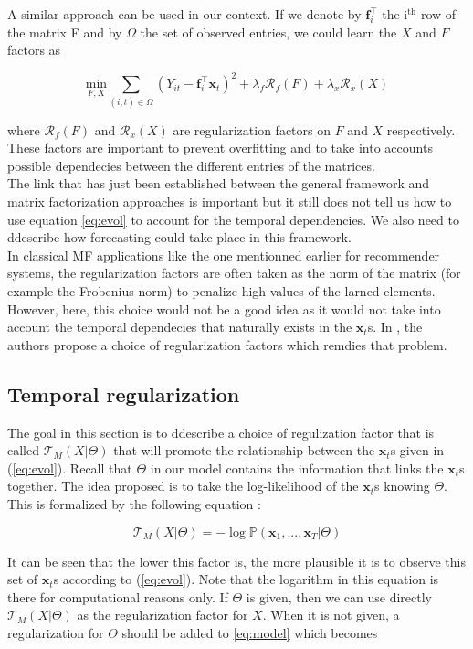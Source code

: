 \documentclass{article}
\begin{document}
A similar approach can be used in our context. If we denote by $\mathbf{f}_i^\top$ the i$^\text{th}$ row of the matrix F and by $\Omega$ the set of observed entries, we could learn the $X$ and $F$ factors as

\begin{equation}
\underset{F,X}{\text{min}} \sum_{(i,t) \in \Omega} (Y_{it} - \mathbf{f}_i^\top\mathbf{x}_t)^2 + \lambda_f \mathcal{R}_f(F) + \lambda_x \mathcal{R}_x(X)
\label{eq:model}
\end{equation}

where $\mathcal{R}_f(F)$ and $\mathcal{R}_x(X)$ are regularization factors on $F$ and $X$ respectively. These factors are important to prevent overfitting and to take into accounts possible dependecies between the different entries of the matrices. \\
The link that has just been established between the general framework and matrix factorization approaches is important but it still does not tell us how to use equation \ref{eq:evol} to account for the temporal dependencies. We also need to ddescribe how forecasting could take place in this framework. \\
In classical MF applications like the one mentionned earlier for recommender systems, the regularization factors are often taken as the norm of the matrix (for example the Frobenius norm) to penalize high values of the larned elements. However, here, this choice would not be a good idea as it would not take into account the temporal dependecies that naturally exists in the $\mathbf{x}_t$s. In \cite{TRMF}, the authors propose a choice of regularization factors which remdies that problem.

\subsection*{Temporal regularization}

The goal in this section is to ddescribe a choice of regulization factor that is called $\mathcal{T}_M(X | \Theta)$ that will promote the relationship between the $\mathbf{x}_t$s given in (\ref{eq:evol}).
Recall that $\Theta$ in our model contains the information that links the $\mathbf{x}_t$s together. The idea proposed is to take the log-likelihood of the $\mathbf{x}_t$s knowing $\Theta$. This is formalized by the following equation :

$$\mathcal{T}_M(X | \Theta) = -\log{\mathbb{P}(\mathbf{x}_1, ..., \mathbf{x}_T|\Theta)}$$

It can be seen that the lower this factor is, the more plausible it is to observe this set of $\mathbf{x}_t$s according to (\ref{eq:evol}). Note that the logarithm in this equation is there for computational reasons only. If $\Theta$ is given, then we can use directly $\mathcal{T}_M(X | \Theta)$ as the regularization factor for $X$. When it is not given, a regularization for $\Theta$ should be added to \ref{eq:model} which becomes
\end{document}
